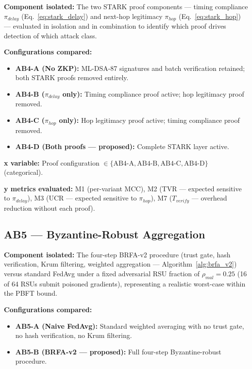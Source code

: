 \documentclass[12pt, a4paper]{report}
\begin{document}
{{\textbf{Component isolated:}
The two \ac{STARK} proof components — timing compliance
$\pi_{delay}$ (Eq.~\ref{eq:stark_delay}) and next-hop
legitimacy $\pi_{hop}$ (Eq.~\ref{eq:stark_hop}) —
evaluated in isolation and in combination to identify
which proof drives detection of which attack class.

\textbf{Configurations compared:}
\begin{itemize}
    \item \textbf{AB4-A (No ZKP):} ML-DSA-87 signatures
    and batch verification retained; both \ac{STARK}
    proofs removed entirely.
    \item \textbf{AB4-B ($\pi_{delay}$ only):}
    Timing compliance proof active; hop legitimacy
    proof removed.
    \item \textbf{AB4-C ($\pi_{hop}$ only):}
    Hop legitimacy proof active; timing compliance
    proof removed.
    \item \textbf{AB4-D (Both proofs — proposed):}
    Complete \ac{STARK} layer active.
\end{itemize}

\textbf{x variable:} Proof configuration
$\in \{\text{AB4-A}, \text{AB4-B},
\text{AB4-C}, \text{AB4-D}\}$ (categorical).

\textbf{y metrics evaluated:} M1 (per-variant MCC),
M2 (TVR — expected sensitive to $\pi_{delay}$),
M3 (UCR — expected sensitive to $\pi_{hop}$),
M7 ($T_{verify}$ — overhead reduction without each proof).


\subsection{AB5 — Byzantine-Robust Aggregation}
\label{sec:ab5}

\textbf{Component isolated:}
The four-step BRFA-v2 procedure (trust gate, hash
verification, Krum filtering, weighted aggregation —
Algorithm~\ref{alg:brfa_v2}) versus standard FedAvg
under a fixed adversarial RSU fraction of
$\rho_{mal} = 0.25$ (16 of 64 RSUs submit poisoned
gradients), representing a realistic worst-case within
the PBFT bound.

\textbf{Configurations compared:}
\begin{itemize}
    \item \textbf{AB5-A (Naive FedAvg):} Standard
    weighted averaging with no trust gate, no hash
    verification, no Krum filtering.
    \item \textbf{AB5-B (BRFA-v2 — proposed):}
    Full four-step Byzantine-robust procedure.
\end{itemize}

}}
\end{document}
